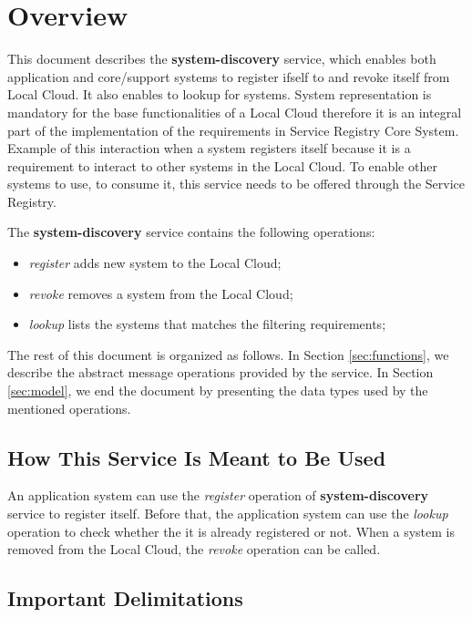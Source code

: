 \documentclass[a4paper]{arrowhead}
\begin{document}
\section{Overview}
\label{sec:overview}
This document describes the \textbf{system-discovery} service, which enables both application and core/support systems to register ifself to and revoke itself from Local Cloud. It also enables to lookup for systems. System representation is mandatory for the base functionalities of a Local Cloud therefore it is an integral part of the implementation of the requirements in Service Registry Core System. Example of this interaction when a system registers itself because it is a requirement to interact to other systems in the Local Cloud. To enable other systems to use, to consume it, this service needs to be offered through the Service Registry.

The \textbf{system-discovery} service contains the following operations:

\begin{itemize}
    \item \textit{register} adds new system to the Local Cloud;
    \item \textit{revoke} removes a system from the Local Cloud;
    \item \textit{lookup} lists the systems that matches the filtering requirements;
\end{itemize}

The rest of this document is organized as follows.
In Section \ref{sec:functions}, we describe the abstract message operations provided by the service.
In Section \ref{sec:model}, we end the document by presenting the data types used by the mentioned operations.

\subsection{How This Service Is Meant to Be Used}
An application system can use the \textit{register} operation of \textbf{system-discovery} service to register itself. Before that, the application system can use the \textit{lookup} operation to check whether the it is already registered or not. When a system is removed from the Local Cloud, the \textit{revoke} operation can be called.

\subsection{Important Delimitations}
\label{sec:delimitations}
\end{document}
